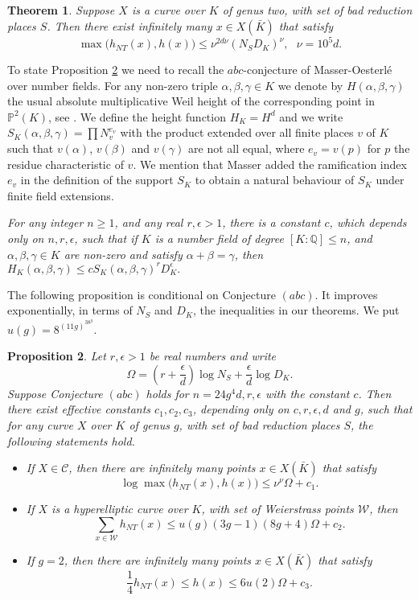 \documentclass[11pt]{article}
\newtheorem{theorem}{Theorem}[section]
\newtheorem{proposition}[theorem]{Proposition}
\numberwithin{equation}{section}
\newcommand {\QQ}  {{\mathbb Q}}
\newcommand {\p} {x}
\begin{document}
\begin{theorem}\label{thm:genus2}
Suppose $X$ is a curve over $K$ of genus two, with set of bad reduction places $S$. Then there exist infinitely many $\p\in X(\bar{K})$ that satisfy $$\max\bigl(h_{NT}(\p),h(\p)\bigl)\leq \nu^{2d\nu}(N_SD_K)^{\nu}, \ \ \ \nu=10^5d.$$
\end{theorem}

To state Proposition \ref{prop:abc} we need to recall the $abc$-conjecture  of Masser-Oesterl\'e \cite{masser:abc} over number fields. 
For any non-zero triple $\alpha,\beta,\gamma\in K$ we denote by $H(\alpha,\beta,\gamma)$ the usual absolute multiplicative Weil height  of the corresponding point in $\mathbb P^2(K)$, see  \cite[1.5.4]{bogu:diophantinegeometry}.
We define the height function $H_K=H^d$ and we write $S_K(\alpha,\beta,\gamma)=\prod N_v^{e_v}$ with the product extended over all finite places $v$ of $K$ such that $v(\alpha)$, $v(\beta)$ and $v(\gamma)$ are not all equal, where $e_v=v(p)$ for $p$ the residue characteristic of $v$. 
We mention that Masser \cite{masser:abc} added the ramification index $e_v$ in the definition of the support $S_K$ to obtain a natural behaviour of $S_K$ under finite field extensions. 

\vspace{0.3cm}
\emph{For any integer $n\geq 1$, and any real $r,\epsilon>1$, there is a constant $c$, which depends only on $n,r,\epsilon$, such that if $K$ is a number field of degree $[K:\QQ]\leq n$, and $\alpha,\beta,\gamma\in K$ are non-zero and satisfy $\alpha+\beta=\gamma$, then $H_K(\alpha,\beta,\gamma)\leq cS_K(\alpha,\beta,\gamma)^rD_K^\epsilon.$\vspace{0.3cm}}



The following proposition is conditional on Conjecture $(abc)$. It improves exponentially, in terms of $N_S$ and $D_K$, the inequalities in our theorems.
We put $u(g)=8^{(11g)^38^g}.$ 

\begin{proposition}\label{prop:abc}
Let $r,\epsilon>1$ be real numbers and write $$\Omega=(r+\frac{\epsilon}{d})\log N_S+\frac{\epsilon}{d}\log D_K.$$
Suppose Conjecture $(abc)$ holds for $n=24g^4d,r,\epsilon$ with the constant $c$.  Then there exist effective constants $c_1,c_2,c_3$, depending only on $c,r,\epsilon,d$ and $g$, such that for any curve $X$ over $K$ of genus $g$, with set of bad reduction places $S$, the following statements hold.
\begin{itemize}
\item[(i)] If $X\in\mathcal C$, then there are infinitely many points $\p\in X(\bar{K})$ that satisfy $$\log\max\bigl(h_{NT}(\p),h(\p)\bigl)\leq \nu^{\nu}\Omega+c_1.$$
\item[(ii)]   If  $X$ is a hyperelliptic curve over $K$, with set of Weierstrass points $\mathcal W$, then $$\sum_{\p\in \mathcal W}h_{NT}(\p)\leq u(g)(3g-1)(8g+4)\Omega+c_2.$$
\item[(iii)] If $g=2$, then there are infinitely many points $\p\in X(\bar{K})$ that satisfy $$\frac{1}{4}h_{NT}(\p)\leq h(\p)\leq  6u(2)\Omega+c_3.$$
\end{itemize}
\end{proposition}
\end{document}
